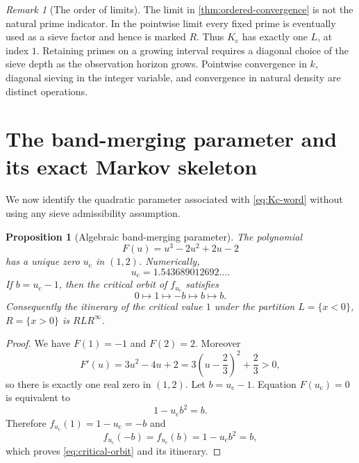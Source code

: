 \documentclass[11pt]{article}
\newtheorem{proposition}[theorem]{Proposition}
\theoremstyle{definition}
\theoremstyle{remark}
\newtheorem{remark}[theorem]{Remark}
\newcommand{\uc}{u_{\mathrm c}}
\newcommand{\Kc}{K_{\mathrm c}}
\begin{document}
\begin{remark}[The order of limits]\label{rem:order-limits}
The limit in \cref{thm:ordered-convergence} is not the natural prime indicator.  In the pointwise limit every fixed prime is eventually used as a sieve factor and hence is marked $R$.  Thus $\Kc$ has exactly one $L$, at index $1$.  Retaining primes on a growing interval requires a diagonal choice of the sieve depth as the observation horizon grows.  Pointwise convergence in $k$, diagonal sieving in the integer variable, and convergence in natural density are distinct operations.
\end{remark}

\section{The band-merging parameter and its exact Markov skeleton}

We now identify the quadratic parameter associated with \eqref{eq:Kc-word} without using any sieve admissibility assumption.

\begin{proposition}[Algebraic band-merging parameter]\label{prop:uc}
The polynomial
\begin{equation}\label{eq:uc-polynomial}
    F(u)=u^3-2u^2+2u-2
\end{equation}
has a unique zero $\uc$ in $(1,2)$.  Numerically,
\[
    \uc=1.543689012692\ldots.
\]
If $b=\uc-1$, then the critical orbit of $f_{\uc}$ satisfies
\begin{equation}\label{eq:critical-orbit}
    0\longmapsto1\longmapsto-b\longmapsto b\longmapsto b.
\end{equation}
Consequently the itinerary of the critical value $1$ under the partition $L=\{x<0\}$, $R=\{x>0\}$ is $RLR^\infty$.
\end{proposition}

\begin{proof}
We have $F(1)=-1$ and $F(2)=2$.  Moreover
\[
    F'(u)=3u^2-4u+2=3\left(u-\frac23\right)^2+\frac23>0,
\]
so there is exactly one real zero in $(1,2)$.  Let $b=\uc-1$.  Equation $F(\uc)=0$ is equivalent to
\[
    1-\uc b^2=b.
\]
Therefore $f_{\uc}(1)=1-\uc=-b$ and
\[
    f_{\uc}(-b)=f_{\uc}(b)=1-\uc b^2=b,
\]
which proves \eqref{eq:critical-orbit} and its itinerary.
\end{proof}
\end{document}

